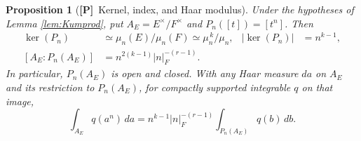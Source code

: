 \documentclass[11pt]{article}
\newcommand{\Ptag}{\textnormal{\textbf{[P]}}}
\theoremstyle{plain}
\newtheorem{proposition}[theorem]{Proposition}
\theoremstyle{definition}
\begin{document}
\begin{proposition}[\Ptag\ Kernel, index, and Haar modulus]\label{prop:power-etale}
Under the hypotheses of Lemma \ref{lem:Kumprod}, put
$A_E=E^\times/F^\times$ and $P_n([t])=[t^n]$.  Then
\begin{align}
 \ker(P_n)&\simeq \mu_n(E)/\mu_n(F)
      \simeq \mu_n^{\,k}/\mu_n,
 &|\ker(P_n)|&=n^{k-1},\label{eq:kernel}\\
 [A_E:P_n(A_E)]&=n^{2(k-1)}|n|_F^{-(r-1)}.
 \label{eq:index}
\end{align}
In particular, $P_n(A_E)$ is open and closed.  With \emph{any}
Haar measure $da$ on $A_E$ and its restriction to $P_n(A_E)$,
for compactly supported integrable $q$ on that image,
\begin{equation}\label{eq:haarJac}
 \int_{A_E}q(a^n)\,da
 =n^{k-1}|n|_F^{-(r-1)}
   \int_{P_n(A_E)}q(b)\,db.
\end{equation}
\end{proposition}
\end{document}
